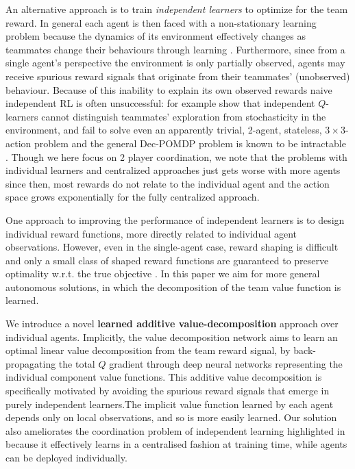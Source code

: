 \documentclass{article}
\begin{document}
An alternative approach is to train \emph{independent learners} to optimize for the team reward. In general each agent is then faced with a non-stationary learning problem because the dynamics of its environment effectively changes as teammates change their behaviours through learning \citep{Laurent11}. Furthermore, since from a single agent's perspective the environment is only partially observed, agents may receive spurious reward signals that originate from their teammates' (unobserved) behaviour. Because of this inability to explain its own observed rewards naive independent RL is often unsuccessful: for example \citet{ClausBoutillierDynamics} show that independent $Q$-learners cannot distinguish teammates' exploration from stochasticity in the environment, and fail to solve even an apparently trivial, 2-agent, stateless, $3\times 3$-action problem and the general Dec-POMDP problem is known to be intractable \citep{BernsteinDecPomdp,OliehoekAmato16book}. Though we here focus on 2 player coordination, we note that the problems with individual learners and centralized approaches just gets worse with more agents since then, most rewards do not relate to the individual agent and the action space grows exponentially for the fully centralized approach.

One approach to improving the performance of independent learners is to design individual reward functions, more directly related to individual agent observations. However, even in the single-agent case, reward shaping is difficult and only a small class of shaped reward functions are guaranteed to preserve optimality w.r.t. the true objective \citep{NgShaping,tumer-devlin_aamas14,EckSDK16}. In this paper we aim for more general autonomous solutions, in which the decomposition of the team value function is learned.



We introduce a novel {\bf learned additive value-decomposition} approach over individual agents. Implicitly, the value decomposition network aims to learn an optimal linear value decomposition from the team reward signal, by back-propagating the total $Q$ gradient through deep neural networks representing the individual component value functions. This additive value decomposition is specifically motivated by avoiding the spurious reward signals that emerge in purely independent learners.The implicit value function learned by each agent depends only on local observations, and so is more easily learned. Our solution also ameliorates the coordination problem of independent learning highlighted in \citet{ClausBoutillierDynamics} because it effectively learns in a centralised fashion at training time, while agents can be deployed individually. 
\end{document}
